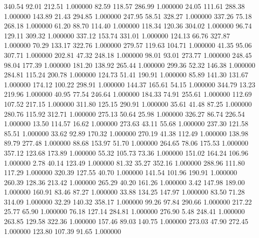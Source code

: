     340.54     92.01    212.51  1.000000
     82.59    118.57    286.99  1.000000
     24.05    111.61    288.38  1.000000
    143.89     21.43    294.85  1.000000
    247.95     58.51    328.27  1.000000
    337.26     75.18    268.18  1.000000
     61.20     88.70    114.40  1.000000
    118.34    120.36    304.02  1.000000
     96.74    129.11    309.32  1.000000
    337.12    153.74    331.01  1.000000
    124.13     66.76    327.87  1.000000
     70.29    133.17    322.76  1.000000
    279.57    119.63    104.71  1.000000
     41.35     95.06    307.71  1.000000
    202.81     47.32    248.18  1.000000
     98.01     93.01    273.77  1.000000
    248.45     98.04    177.39  1.000000
    181.20    138.92    265.44  1.000000
    299.36     52.32    146.38  1.000000
    284.81    115.24    200.78  1.000000
    124.73     51.41    190.91  1.000000
     85.89    141.30    131.67  1.000000
    174.12    100.22    298.91  1.000000
    144.37    165.61     54.15  1.000000
    344.79     13.23    219.96  1.000000
     40.95     77.54    246.64  1.000000
    184.33     74.91    255.61  1.000000
    112.69    107.52    217.15  1.000000
    311.80    125.15    290.91  1.000000
     35.61     41.48     87.25  1.000000
    280.76    115.92    312.71  1.000000
    275.13     50.64     25.98  1.000000
    326.27     86.74    226.54  1.000000
     13.50    114.57     16.62  1.000000
    273.63     43.11     55.68  1.000000
    237.30    121.58     85.51  1.000000
     33.62     92.89    170.32  1.000000
    270.19     41.38    112.49  1.000000
    138.98     89.79    277.48  1.000000
     88.68    153.97     51.70  1.000000
    264.65     78.06    175.53  1.000000
    357.12    123.68    173.89  1.000000
     55.32    105.73     73.36  1.000000
    151.02    164.24    106.96  1.000000
      2.78     40.14    123.49  1.000000
     81.32     35.27    352.16  1.000000
    288.96    111.80    117.29  1.000000
    320.39    127.55     40.70  1.000000
    141.54    101.96    190.91  1.000000
    260.39    128.36    213.42  1.000000
    265.29     40.20    161.26  1.000000
      3.42    147.98    189.00  1.000000
    160.91     83.46     87.27  1.000000
     33.88    134.25    147.97  1.000000
     83.50     71.28    314.09  1.000000
     32.29    140.32    358.17  1.000000
     99.26     97.84    290.66  1.000000
    217.22     25.77     65.90  1.000000
     76.18    127.14    284.81  1.000000
    276.90      5.48    248.41  1.000000
    263.85    129.58    322.36  1.000000
    157.46     89.03    140.75  1.000000
    273.03     47.90    272.45  1.000000
    123.80    107.39     91.65  1.000000
